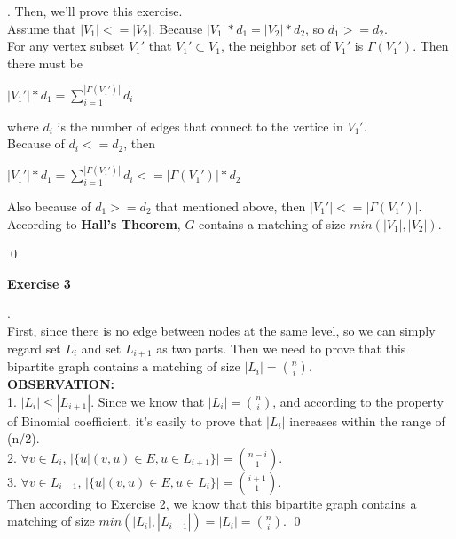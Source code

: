 \documentclass[12pt, notitlepage]{article}
\newenvironment{sol}
  {\par\vspace{3mm}\noindent{\it Solution}.}{\qed}
\begin{document}
\begin{sol}
Then, we'll prove this exercise.\\
Assume that $|V_1| <= |V_2|$. Because $|V_1|*d_1 = |V_2|*d_2$, so $d_1 >= d_2$.\\
For any vertex subset $V_1'$ that $V_1'\subset V_1$, the neighbor set of $V_1'$ is $\Gamma (V_1')$. Then there must be
\centerline{$|V_1'|*d_1 = \sum\limits^{|\Gamma (V_1')|}_{i=1}d_i$}
where $d_i$ is the number of edges that connect to the vertice in $V_1'$.\\
Because of $d_i <= d_2$, then\\
\centerline{$|V_1'|*d_1 = \sum\limits^{|\Gamma (V_1')|}_{i=1}d_i <= |\Gamma (V_1')| * d_2$}
Also because of $d_1 >= d_2$ that mentioned above, then $|V_1'| <= |\Gamma (V_1')|$.\\
According to \textbf{Hall's Theorem},  $G$ contains a matching of size $min(|V_1|, |V_2|)$.

\end{sol}


\textbf{Exercise 3}
\begin{sol}\\
First, since there is no edge between nodes at the same level, so we can simply regard set $L_i$ and set $L_{i+1}$ as two parts. Then we need to prove that this bipartite graph contains a matching of size $|L_i|=\binom{n}{i}$.\\
\textbf{OBSERVATION:}\\
1. $|L_i|\leq |L_{i+1}|$. Since we know that $|L_i|=\binom{n}{i}$, and according to the property of Binomial coefficient, it's easily to prove that $|L_i|$ increases within the range of (n/2).\\
2. $\forall v\in L_i$, $|\{u|(v,u)\in E, u\in L_{i+1}\}|=\binom{n-i}{1}$.\\
3. $\forall v\in L_{i+1}$, $|\{u|(v,u)\in E, u\in L_i\}|=\binom{i+1}{1}$.\\
Then according to Exercise 2, we know that this bipartite graph contains a matching of size $min(|L_i|,|L_{i+1}|)=|L_i|=\binom{n}{i}$.
\end{sol}\\
\end{document}
